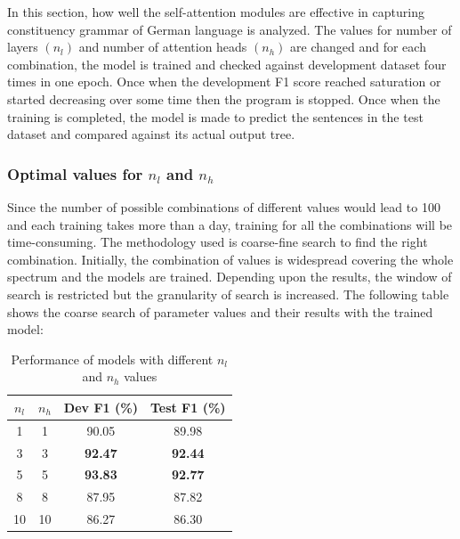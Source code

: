 \documentclass[a4paper, 11pt]{article}
\begin{document}
In this section, how well the self-attention modules are effective in capturing constituency grammar of German language is analyzed. The values for number of layers $(n_l)$ and number of attention heads $(n_h)$ are changed and for each combination, the model is trained and checked against development dataset four times in one epoch. Once when the development F1 score reached saturation or started decreasing over some time then the program is stopped. Once when the training is completed, the model is made to predict the sentences in the test dataset and compared against its actual output tree. 

\subsubsection{Optimal values for $n_l$ and $n_h$}

Since the number of possible combinations of different values would lead to 100 and each training takes more than a day, training for all the combinations will be time-consuming. The methodology used is coarse-fine search to find the right combination. Initially, the combination of values is widespread covering the whole spectrum and the models are trained. Depending upon the results, the window of search is restricted but the granularity of search is increased. The following table shows the coarse search of parameter values and their results with the trained model:

\begin{table}[h!]
  \begin{center}
    \label{tab:coarse_search_for_layers_heads}
    \def\arraystretch{1.5}%
    \begin{tabular}{c|c|c|c}
      \textbf{$n_l$} & \textbf{$n_h$} & Dev F1 (\%) & Test F1 (\%) \\
      \hline
      1 & 1 & 90.05 & 89.98\\
      3 & 3 & \textbf{92.47} & \textbf{92.44}\\
      5 & 5 & \textbf{93.83} & \textbf{92.77}\\
      8 & 8 & 87.95 & 87.82\\
      10 & 10 & 86.27 & 86.30\\
    \end{tabular}
    \caption{Performance of models with different $n_l$ and $n_h$ values}
  \end{center}
\end{table}
\end{document}
